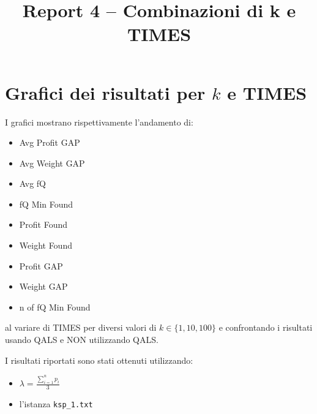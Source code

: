 \documentclass[a4paper,12pt]{article}
\title{Report 4 -- Combinazioni di k e TIMES}
\begin{document}
\maketitle

\newpage

\section{Grafici dei risultati per $k$ e TIMES}

I grafici mostrano rispettivamente l'andamento di:
\begin{itemize}
    \item Avg Profit GAP   
    \item Avg Weight GAP   
    \item Avg fQ           
    \item fQ Min Found     
    \item Profit Found     
    \item Weight Found     
    \item Profit GAP       
    \item Weight GAP       
    \item n of fQ Min Found
\end{itemize}
al variare di TIMES per diversi valori di $k \in \{1,10,100\}$ e confrontando
i risultati usando QALS e NON utilizzando QALS.

I risultati riportati sono stati ottenuti utilizzando:

\begin{itemize}
    \item $\lambda = \frac{\sum_{i=1}^{n} p_i}{3}$
    \item l'istanza \texttt{ksp\_1.txt}
\end{itemize}
\end{document}
